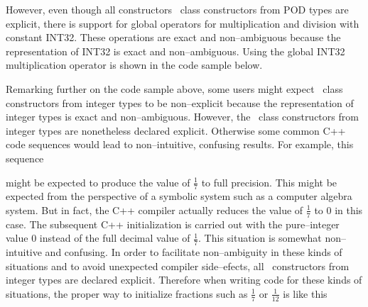 However, even though all constructors \efloatclass\ class constructors
from POD types are explicit, there is support for global operators
for multiplication and division with constant {\courier INT32}.
These operations are exact and non--ambiguous because the representation
of {\courier INT32} is exact and non--ambiguous. Using the global
{\courier INT32} multiplication operator is shown in the code sample below.

\vspace{4.0pt}



\vspace{4.0pt}

\noindent Remarking further on the code sample above, some users might expect
\efloatclass\ class constructors from integer types to be non--explicit
because the representation of integer types is exact and non--ambiguous.
However, the \efloatclass\ class constructors from integer types are
nonetheless declared explicit. Otherwise some common C++ code sequences would
lead to non--intuitive, confusing results. For example, this sequence

\vspace{4.0pt}



\vspace{4.0pt}

\noindent might be expected to produce the value of $\frac{1}{7}$ to full precision.
This might be expected from the perspective of a symbolic system such as a
computer algebra system. But in fact, the C++ compiler actually reduces the value
of $\frac{1}{7}$ to $0$ in this case. The subsequent C++ initialization is
carried out with the pure--integer value $0$ instead of the full decimal
value of $\frac{1}{7}$. This situation is somewhat non--intuitive and confusing.
In order to facilitate non--ambiguity in these kinds of situations and to
avoid unexpected compiler side--efects, all \efloatclass\ constructors
from integer types are declared {\courier explicit}. Therefore when writing
code for these kinds of situations, the proper way to initialize fractions
such as $\frac{1}{7}$ or $\frac{1}{12}$ is like this

\vspace{4.0pt}



